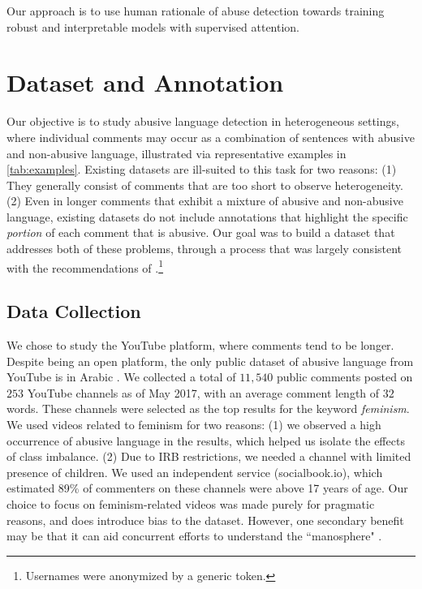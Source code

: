 \documentclass[letterpaper]{article} %
\begin{document}
Our approach is to use  human rationale of abuse detection towards training robust and interpretable models with supervised attention.


\section{Dataset and Annotation}
\label{sec:dataset}

Our objective is to study abusive language detection in heterogeneous settings, where  individual comments may occur as a combination of sentences with abusive and non-abusive language, illustrated via representative examples in \ref{tab:examples}.
Existing datasets are ill-suited to this task for two reasons: (1) They generally consist of comments that are too short to observe heterogeneity.
(2) Even in longer comments that exhibit a mixture of abusive and non-abusive language, existing datasets do not include annotations that highlight the specific \textit{portion} of each comment that is abusive.
Our goal was to build a dataset that addresses  both of these problems, through a process that was largely consistent with the recommendations of \cite{vidgen2019challenges}.\footnote{Usernames were anonymized by a generic token.}


\subsection{Data Collection}
We chose to study the YouTube platform, where comments tend to be longer.
Despite being an open platform, the  only public dataset of abusive language from YouTube is in Arabic \cite{alakrot2018dataset}.
We collected a total of $11,540$ public comments posted on $253$ YouTube channels as of May 2017,
with an average comment length of $32$ words.
These channels were selected as the top results for the keyword \textit{feminism}.
We used videos related to feminism  for two reasons:
(1) we observed a high occurrence of abusive language in the results, which helped us isolate the effects of class imbalance.
(2) Due to IRB restrictions, we needed a channel with limited presence of children. We used an independent service (socialbook.io), which estimated 89\% of commenters on these channels were above 17 years of age.
Our choice to focus on feminism-related videos was made purely for pragmatic reasons, and does introduce bias to the dataset.
However, one secondary benefit may be that it can aid concurrent efforts to understand the ``manosphere" \cite{ribeiroevolution}.
\end{document}
